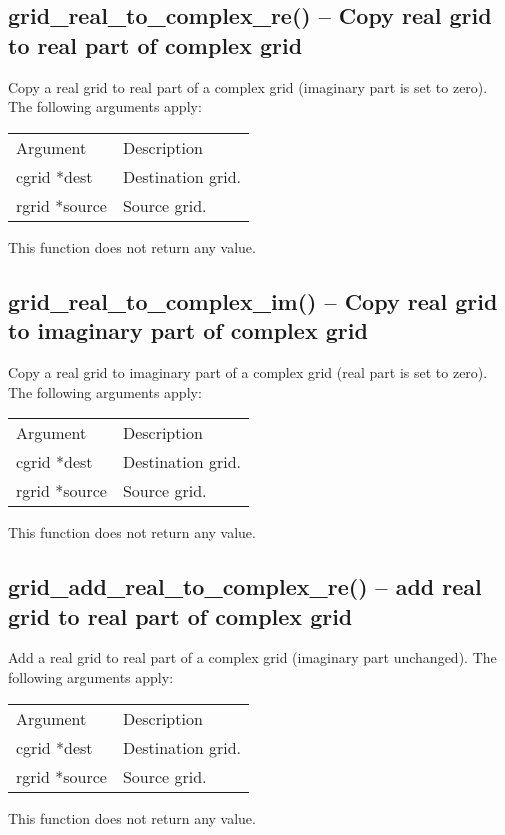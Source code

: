 \documentclass[12pt,letterpaper]{report}
\begin{document}
\subsection{grid\_real\_to\_complex\_re() -- Copy real grid to real part of complex grid}

Copy a real grid to real part of a complex grid (imaginary part is set to zero). The following arguments apply:
\begin{longtable}{p{} p{}}
Argument & Description\\
\cline{1-2}
cgrid *dest & Destination grid.\\
rgrid *source & Source grid.\\
\end{longtable}
\noindent
This function does not return any value.

\subsection{grid\_real\_to\_complex\_im() -- Copy real grid to imaginary part of complex grid}

Copy a real grid to imaginary part of a complex grid (real part is set to zero). The following arguments apply:
\begin{longtable}{p{} p{}}
Argument & Description\\
\cline{1-2}
cgrid *dest & Destination grid.\\
rgrid *source & Source grid.\\
\end{longtable}
\noindent
This function does not return any value.

\subsection{grid\_add\_real\_to\_complex\_re() -- add real grid to real part of complex grid}

Add a real grid to real part of a complex grid (imaginary part unchanged). The following arguments apply:
\begin{longtable}{p{} p{}}
Argument & Description\\
\cline{1-2}
cgrid *dest & Destination grid.\\
rgrid *source & Source grid.\\
\end{longtable}
\noindent
This function does not return any value.
\end{document}
